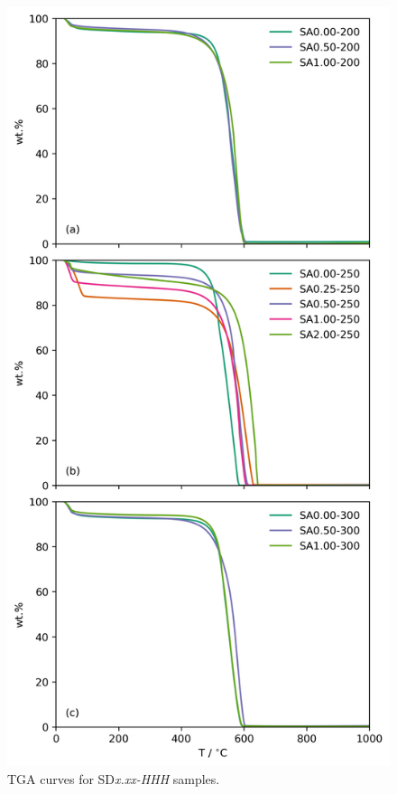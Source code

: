 


\begin{subappendices}

\begin{figure}[h!]
    \centering
    \includegraphics[width=0.8\columnwidth, keepaspectratio]{4-impregnation/figs/SD_tga_adj.png}
    \caption{TGA curves for SD\textit{x.xx-HHH} samples.}
    \label{fig:SD_tga}
\end{figure}


\end{subappendices}
